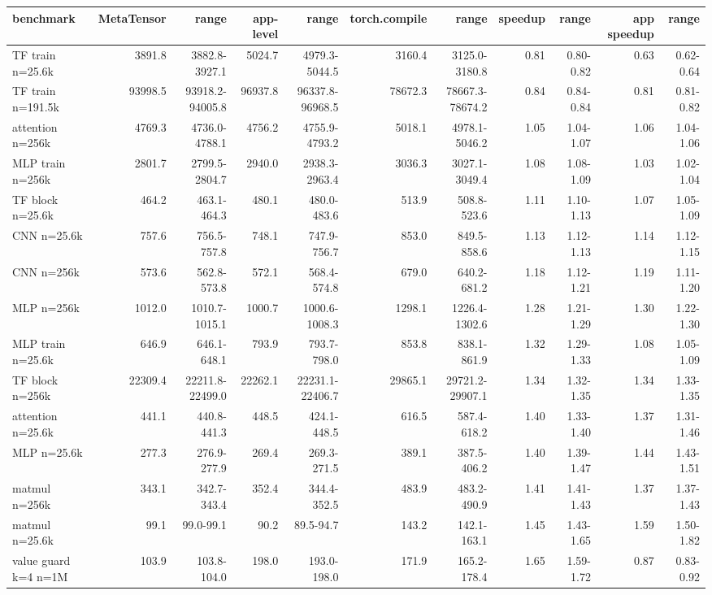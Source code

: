 \begin{tabular}{lrrrrrrrrrr}
\toprule
benchmark & MetaTensor & range & app-level & range & torch.compile & range & speedup & range & app speedup & range \\
\midrule
TF train n=25.6k & 3891.8 & 3882.8-3927.1 & 5024.7 & 4979.3-5044.5 & 3160.4 & 3125.0-3180.8 & 0.81 & 0.80-0.82 & 0.63 & 0.62-0.64 \\
TF train n=191.5k & 93998.5 & 93918.2-94005.8 & 96937.8 & 96337.8-96968.5 & 78672.3 & 78667.3-78674.2 & 0.84 & 0.84-0.84 & 0.81 & 0.81-0.82 \\
attention n=256k & 4769.3 & 4736.0-4788.1 & 4756.2 & 4755.9-4793.2 & 5018.1 & 4978.1-5046.2 & 1.05 & 1.04-1.07 & 1.06 & 1.04-1.06 \\
MLP train n=256k & 2801.7 & 2799.5-2804.7 & 2940.0 & 2938.3-2963.4 & 3036.3 & 3027.1-3049.4 & 1.08 & 1.08-1.09 & 1.03 & 1.02-1.04 \\
TF block n=25.6k & 464.2 & 463.1-464.3 & 480.1 & 480.0-483.6 & 513.9 & 508.8-523.6 & 1.11 & 1.10-1.13 & 1.07 & 1.05-1.09 \\
CNN n=25.6k & 757.6 & 756.5-757.8 & 748.1 & 747.9-756.7 & 853.0 & 849.5-858.6 & 1.13 & 1.12-1.13 & 1.14 & 1.12-1.15 \\
CNN n=256k & 573.6 & 562.8-573.8 & 572.1 & 568.4-574.8 & 679.0 & 640.2-681.2 & 1.18 & 1.12-1.21 & 1.19 & 1.11-1.20 \\
MLP n=256k & 1012.0 & 1010.7-1015.1 & 1000.7 & 1000.6-1008.3 & 1298.1 & 1226.4-1302.6 & 1.28 & 1.21-1.29 & 1.30 & 1.22-1.30 \\
MLP train n=25.6k & 646.9 & 646.1-648.1 & 793.9 & 793.7-798.0 & 853.8 & 838.1-861.9 & 1.32 & 1.29-1.33 & 1.08 & 1.05-1.09 \\
TF block n=256k & 22309.4 & 22211.8-22499.0 & 22262.1 & 22231.1-22406.7 & 29865.1 & 29721.2-29907.1 & 1.34 & 1.32-1.35 & 1.34 & 1.33-1.35 \\
attention n=25.6k & 441.1 & 440.8-441.3 & 448.5 & 424.1-448.5 & 616.5 & 587.4-618.2 & 1.40 & 1.33-1.40 & 1.37 & 1.31-1.46 \\
MLP n=25.6k & 277.3 & 276.9-277.9 & 269.4 & 269.3-271.5 & 389.1 & 387.5-406.2 & 1.40 & 1.39-1.47 & 1.44 & 1.43-1.51 \\
matmul n=256k & 343.1 & 342.7-343.4 & 352.4 & 344.4-352.5 & 483.9 & 483.2-490.9 & 1.41 & 1.41-1.43 & 1.37 & 1.37-1.43 \\
matmul n=25.6k & 99.1 & 99.0-99.1 & 90.2 & 89.5-94.7 & 143.2 & 142.1-163.1 & 1.45 & 1.43-1.65 & 1.59 & 1.50-1.82 \\
value guard k=4 n=1M & 103.9 & 103.8-104.0 & 198.0 & 193.0-198.0 & 171.9 & 165.2-178.4 & 1.65 & 1.59-1.72 & 0.87 & 0.83-0.92 \\

\end{tabular}
